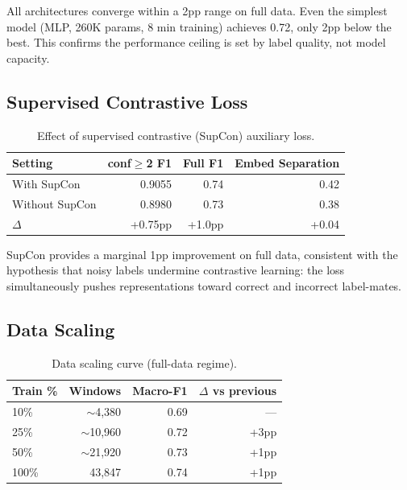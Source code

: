 \documentclass[11pt]{article}
\begin{document}
All architectures converge within a 2pp range on full data.
Even the simplest model (MLP, 260K params, 8 min training) achieves 0.72, only 2pp below the best.
This confirms the performance ceiling is set by label quality, not model capacity.

\subsection{Supervised Contrastive Loss}
\label{sec:ablation_supcon}

\begin{table}[h]
\centering
\caption{Effect of supervised contrastive (SupCon) auxiliary loss.}
\label{tab:supcon}
\begin{tabular}{lrrr}
\toprule
\textbf{Setting} & \textbf{conf$\geq$2 F1} & \textbf{Full F1} & \textbf{Embed Separation} \\
\midrule
With SupCon & 0.9055 & 0.74 & 0.42 \\
Without SupCon & 0.8980 & 0.73 & 0.38 \\
\midrule
$\Delta$ & +0.75pp & +1.0pp & +0.04 \\
\bottomrule
\end{tabular}
\end{table}

SupCon provides a marginal 1pp improvement on full data, consistent with the hypothesis that noisy labels undermine contrastive learning: the loss simultaneously pushes representations toward correct and incorrect label-mates.

\subsection{Data Scaling}
\label{sec:scaling}

\begin{table}[h]
\centering
\caption{Data scaling curve (full-data regime).}
\label{tab:scaling}
\begin{tabular}{lrrr}
\toprule
\textbf{Train \%} & \textbf{Windows} & \textbf{Macro-F1} & \textbf{$\Delta$ vs previous} \\
\midrule
10\% & $\sim$4,380 & 0.69 & --- \\
25\% & $\sim$10,960 & 0.72 & +3pp \\
50\% & $\sim$21,920 & 0.73 & +1pp \\
100\% & 43,847 & 0.74 & +1pp \\
\bottomrule
\end{tabular}
\end{table}
\end{document}
